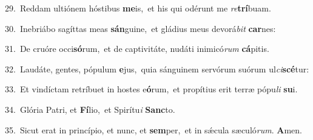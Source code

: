 {\numbfont\textcolor{\numbcolor}{29.}}~Reddam ultiónem hóstibus \textbf{me}\-is,~\star et his qui odérunt me \textit{re}\-\textbf{trí}buam.\par
{\numbfont\textcolor{\numbcolor}{30.}}~Inebriábo sagíttas meas \textbf{sán}\-guine,~\star et gládius meus devorá\textit{bit} \textbf{car}\-nes:\par
{\numbfont\textcolor{\numbcolor}{31.}}~De cruóre occi\-\textbf{só}\-rum,~\star et de captivitáte, nudáti inimicó\textit{rum} \textbf{cá}\-pitis.\par
{\numbfont\textcolor{\numbcolor}{32.}}~Laudáte, gentes, pópulum \textbf{e}\-jus,~\star quia sánguinem servórum suórum ul\-\textit{ci}\-\textbf{scé}tur:\par
{\numbfont\textcolor{\numbcolor}{33.}}~Et vindíctam retríbuet in hostes e\-\textbf{ó}\-rum,~\star et propítius erit terræ pópu\textit{li} \textbf{su}\-i.\par
{\numbfont\textcolor{\numbcolor}{34.}}~Glória Patri, et \textbf{Fí}\-lio,~\star et Spirítu\textit{i} \textbf{Sanc}\-to.\par
{\numbfont\textcolor{\numbcolor}{35.}}~Sicut erat in princípio, et nunc, et \textbf{sem}\-per,~\star et in sǽcula sæculó\-\textit{rum}\-. \textbf{A}\-men.\par
